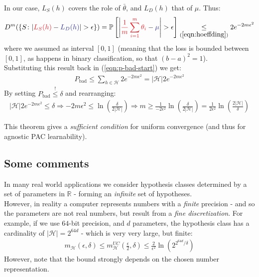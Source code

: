 \documentclass[../template.tex]{subfiles}
\begin{document}
In our case, $L_S(h)$ covers the role of $\bar{\theta}$, and $L_D(h)$ that of $\mu$. Thus:
\begin{align*}
    D^m(\{S\colon |\textcolor{Red}{L_S(h)} - \textcolor{Blue}{L_D(h)}| > \epsilon\}) = \mathbb{P}\left[\left|\textcolor{Red}{\frac{1}{m} \sum_{i=1}^{m} \theta_i} - \textcolor{Blue}{\mu} \right| > \epsilon\right] \underset{(\ref{eqn:hoeffding})}{\leq}  2 e^{-2m \epsilon^2}
\end{align*}   
where we assumed as interval $[0,1]$ (meaning that the loss is bounded between $[0,1]$, as happens in binary classification, so that $(b-a)^2 = 1$). \\
Substituting this result back in (\ref{eqn:p-bad-start}) we get:
\begin{align*}
    P_{\mathrm{bad}} \leq \sum_{h\in \mathcal{H}} 2e^{-2m \epsilon^2} = |\mathcal{H}| 2 e^{-2m \epsilon^2}
\end{align*}
By setting $P_{\mathrm{bad}} \overset{!}{\leq} \delta$ and rearranging:
\begin{align*}
    |\mathcal{H}| 2e^{-2m \epsilon^2} \leq \delta \Rightarrow -2m \epsilon^2 \leq \ln \left(\frac{\delta}{2 |\mathcal{H}|} \right) \Rightarrow m \geq \frac{1}{-2 \epsilon^2} \ln\left(\frac{\delta}{2|\mathcal{H}|} \right) = \frac{1}{2 \epsilon^2} \ln\left(\frac{2|\mathcal{H}|}{\delta} \right) 
\end{align*} 

This theorem gives a \textit{sufficient condition} for uniform convergence (and thus for agnostic PAC learnability).

\subsection{Some comments}
In many real world applications we consider hypothesis classes determined by a set of parameters in $\mathbb{R}$ - forming an \textit{infinite} set of hypotheses.\\
However, in reality a computer represents numbers with a \textit{finite} precision - and so the parameters are not real numbers, but result from a \textit{fine discretization}. For example, if we use $64$-bit precision, and $d$ parameters, the hypothesis class has a cardinality of $|\mathcal{H}| = 2^{64 d}$ - which is very very large, but finite:
\begin{align*}
    m_{\mathcal{H}}(\epsilon, \delta) \leq m_{\mathcal{H}}^{UC} \left(\frac{\epsilon}{2}, \delta \right) \leq \frac{2}{\epsilon^2}  \ln \left(2^{2^{64d}/\delta}\right)
\end{align*}  
However, note that the bound strongly depends on the chosen number representation.
\end{document}
